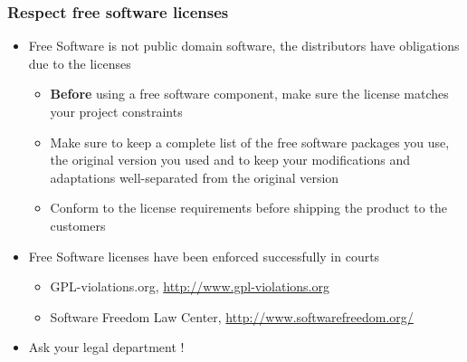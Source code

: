 \begin{frame}
  \frametitle{Respect free software licenses}
  \begin{itemize}
  \item Free Software is not public domain software, the distributors
    have obligations due to the licenses
    \begin{itemize}
    \item {\bf Before} using a free software component, make sure the
      license matches your project constraints
    \item Make sure to keep a complete list of the free software
      packages you use, the original version you used and to keep your
      modifications and adaptations well-separated from the original
      version
    \item Conform to the license requirements before shipping the
      product to the customers
    \end{itemize}
  \item Free Software licenses have been enforced successfully in
    courts
    \begin{itemize}
    \item GPL-violations.org, \url{http://www.gpl-violations.org}
    \item Software Freedom Law Center, \url{http://www.softwarefreedom.org/}
    \end{itemize}
  \item Ask your legal department !
  \end{itemize}
\end{frame}

